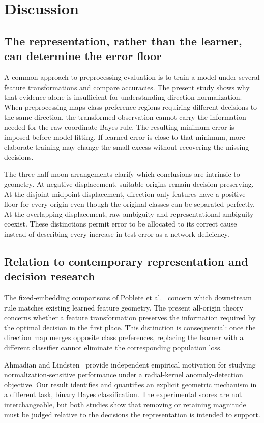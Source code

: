 \documentclass[12pt,a4paper]{article}
\begin{document}
\section{Discussion}
\subsection{The representation, rather than the learner, can determine the error floor}
A common approach to preprocessing evaluation is to train a model under several feature transformations and compare accuracies. The present study shows why that evidence alone is insufficient for understanding direction normalization. When preprocessing maps class-preference regions requiring different decisions to the same direction, the transformed observation cannot carry the information needed for the raw-coordinate Bayes rule. The resulting minimum error is imposed before model fitting. If learned error is close to that minimum, more elaborate training may change the small excess without recovering the missing decisions.

The three half-moon arrangements clarify which conclusions are intrinsic to geometry. At negative displacement, suitable origins remain decision preserving. At the disjoint midpoint displacement, direction-only features have a positive floor for every origin even though the original classes can be separated perfectly. At the overlapping displacement, raw ambiguity and representational ambiguity coexist. These distinctions permit error to be allocated to its correct cause instead of describing every increase in test error as a network deficiency.

\subsection{Relation to contemporary representation and decision research}
The fixed-embedding comparisons of Poblete et al.~\citep{Poblete2026} concern which downstream rule matches existing learned feature geometry. The present all-origin theory concerns whether a feature transformation preserves the information required by the optimal decision in the first place. This distinction is consequential: once the direction map merges opposite class preferences, replacing the learner with a different classifier cannot eliminate the corresponding population loss.

Ahmadian and Lindsten~\citep{Ahmadian2025} provide independent empirical motivation for studying normalization-sensitive performance under a radial-kernel anomaly-detection objective. Our result identifies and quantifies an explicit geometric mechanism in a different task, binary Bayes classification. The experimental scores are not interchangeable, but both studies show that removing or retaining magnitude must be judged relative to the decisions the representation is intended to support.
\end{document}
